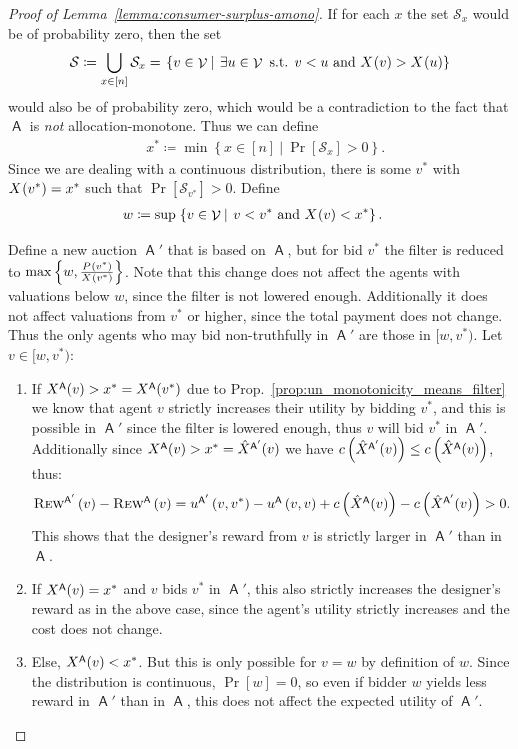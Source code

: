 \documentclass[11pt,letterpaper]{article}
\newcommand{\set}[1]{\left\{#1\right\}}
\newcommand{\brackets}[1]{\left( #1 \right)}
\newcommand{\amono}{allocation-monotone\xspace}
\newcommand \sett[2] { \left.\left\{{#1}\medspace\right\vert\medspace{#2}\right\}}
\newcommand{\sqrrange}[1]{[#1]}
\DeclareMathOperator{\A}{\auc{A}}
\renewcommand{\S}{\mathcal{S}}
\DeclareMathOperator{\V}{\mathcal{V}}
\newcommand{\vstar}{{v^*}}
\newcommand{\xstar}{{x^*}}
\theoremstyle{plain}
\newcommand{\auc}[1]{\mathsf{#1}}
\begin{document}
\begin{proof}[Proof of Lemma~\ref{lemma:consumer-surplus-amono}]
    If for each $x$ the set $\S_x$ would be of probability zero, then the set 
    $${\S\coloneq\bigcup_{x\in\sqrrange{n}}\S_x}=\sett{v\in\V}{\exists u\in\V\textnormal{ s.t. }v<u\textnormal{ and }\x{v}>\x{u}}$$
    would also be of probability zero, which would be a contradiction to the fact that $\A$ is \emph{not} \amono. Thus we can define 
    \begin{align*}
        &\xstar\coloneq\min\sett{x\in\sqrrange{n}}{\Pr[\S_x]>0}.
    \end{align*}
    Since we are dealing with a continuous distribution, there is some $\vstar$ with $\x{\vstar}=\xstar$ such that ${\Pr[\S_{\vstar}]>0}$.
    Define
    \begin{align*}
        &w\coloneq\sup\sett{v\in\V}{v<\vstar\textnormal{ and }\x{v}<\xstar}.
    \end{align*}
    
    Define a new auction $\A'$ that is based on $\A$, but for bid $\vstar$ the filter is reduced to $\max\set{w,\frac{\p{\vstar}}{\x{\vstar}}}$. Note that this change does not affect the agents with valuations below $w$, since the filter is not lowered enough. Additionally it does not affect valuations from $\vstar$ or higher, since the total payment does not change. Thus the only agents who may bid non-truthfully in $\A'$ are those in $[w,\vstar)$. Let $v\in[w,\vstar)$:
    \begin{enumerate}
        \item If $\x[\A]{v}>\xstar=\x[\A]{\vstar}$ due to Prop.~\ref{prop:un_monotonicity_means_filter} we know that agent $v$ strictly increases their utility by bidding $\vstar$, and this is possible in $\A'$ since the filter is lowered enough, thus $v$ will bid $\vstar$ in $\A'$. Additionally since $\x[\A]{v}>\xstar=\xhat[\A']{v}$ we have $c\brackets{\xhat[\A']{v}}\leq c\brackets{\xhat[\A]{v}}$, thus:
        \begin{align*}
            \trew[\A']{v}-\trew[\A]{v}&=\util[\A']{v}{\vstar}-\util[\A]{v}{v}+c\brackets{\xhat[\A]{v}}-c\brackets{\xhat[\A']{v}}>0.
        \end{align*}
        This shows that the designer's reward from $v$ is strictly larger in $\A'$ than in $\A$.
        \item If $\x[\A]{v}=\xstar$ and $v$ bids $\vstar$ in $\A'$, this also strictly increases the designer's reward as in the above case, since the agent's utility strictly increases and the cost does not change.
        \item Else, $\x[\A]{v}<\xstar$. But this is only possible for $v=w$ by definition of $w$. Since the distribution is continuous, $\Pr[w]=0$, so even if bidder $w$ yields less reward in $\A'$ than in $\A$, this does not affect the expected utility of $\A'$.
    \end{enumerate}
    

\end{proof}
\end{document}
